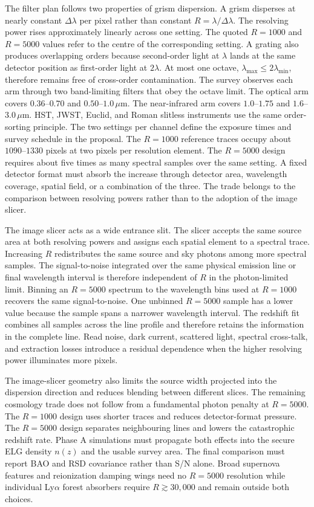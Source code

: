 The filter plan follows two properties of grism dispersion. A grism disperses at nearly constant $\Delta\lambda$ per pixel rather than constant $R=\lambda/\Delta\lambda$. The resolving power rises approximately linearly across one setting. The quoted $R=1000$ and $R=5000$ values refer to the centre of the corresponding setting. A grating also produces overlapping orders because second-order light at $\lambda$ lands at the same detector position as first-order light at $2\lambda$. At most one octave, $\lambda_{\max}\leq2\lambda_{\min}$, therefore remains free of cross-order contamination. The survey observes each arm through two band-limiting filters that obey the octave limit. The optical arm covers $0.36$--$0.70$ and $0.50$--$1.0\,\mu$m. The near-infrared arm covers $1.0$--$1.75$ and $1.6$--$3.0\,\mu$m. HST, JWST, Euclid, and Roman slitless instruments use the same order-sorting principle. The two settings per channel define the exposure times and survey schedule in the proposal. The $R=1000$ reference traces occupy about $1090$--$1330$ pixels at two pixels per resolution element. The $R=5000$ design requires about five times as many spectral samples over the same setting. A fixed detector format must absorb the increase through detector area, wavelength coverage, spatial field, or a combination of the three. The trade belongs to the comparison between resolving powers rather than to the adoption of the image slicer.

The image slicer acts as a wide entrance slit. The slicer accepts the same source area at both resolving powers and assigns each spatial element to a spectral trace. Increasing $R$ redistributes the same source and sky photons among more spectral samples. The signal-to-noise integrated over the same physical emission line or final wavelength interval is therefore independent of $R$ in the photon-limited limit. Binning an $R=5000$ spectrum to the wavelength bins used at $R=1000$ recovers the same signal-to-noise. One unbinned $R=5000$ sample has a lower value because the sample spans a narrower wavelength interval. The redshift fit combines all samples across the line profile and therefore retains the information in the complete line. Read noise, dark current, scattered light, spectral cross-talk, and extraction losses introduce a residual dependence when the higher resolving power illuminates more pixels.

The image-slicer geometry also limits the source width projected into the dispersion direction and reduces blending between different slices. The remaining cosmology trade does not follow from a fundamental photon penalty at $R=5000$. The $R=1000$ design uses shorter traces and reduces detector-format pressure. The $R=5000$ design separates neighbouring lines and lowers the catastrophic redshift rate. Phase A simulations must propagate both effects into the secure ELG density $n(z)$ and the usable survey area. The final comparison must report BAO and RSD covariance rather than S/N alone. Broad supernova features and reionization damping wings need no $R=5000$ resolution while individual Ly$\alpha$ forest absorbers require $R\gtrsim30{,}000$ and remain outside both choices.

